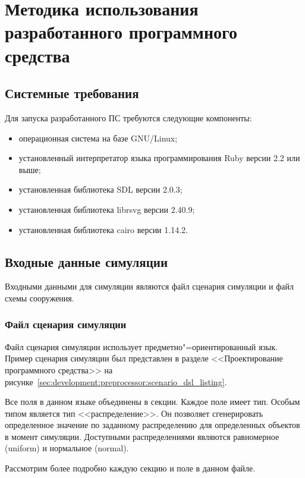 \section{Методика использования разработанного программного средства}
\label{sec:manual}

\subsection{Системные требования}
\label{sec:manual:requirements}

Для запуска разработанного ПС требуются следующие компоненты:
\begin{itemize}
  \item операционная система на базе GNU/Linux;
  \item установленный интерпретатор языка программирования Ruby версии 2.2 или выше;
  \item установленная библиотека SDL версии 2.0.3;
  \item установленная библиотека librsvg версии 2.40.9;
  \item установленная библиотека cairo версии 1.14.2.
\end{itemize}

\subsection{Входные данные симуляции}
\label{sec:manual:input}

Входными данными для симуляции являются файл сценария симуляции и файл схемы сооружения.

\subsubsection{Файл сценария симуляции}
\label{sec:manual:input:scenario}

Файл сценария симуляции использует предметно"=ориентированный язык.
Пример сценария симуляции был представлен в разделе <<Проектирование программного средства>> на рисунке~\ref{sec:development:preprocessor:scenario_dsl_listing}.

Все поля в данном языке объединены в секции.
Каждое поле имеет тип. Особым типом является тип <<распределение>>.
Он позволяет сгенерировать определенное значение по заданному распределению для определенных объектов в момент симуляции.
Доступными распределениями являются равномерное (uniform) и нормальное (normal).

Рассмотрим более подробно каждую секцию и поле в данном файле.

